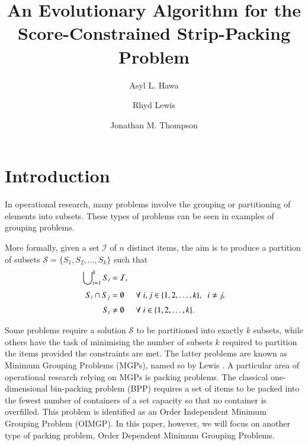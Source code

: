 \documentclass{elsarticle}
\begin{document}
	
\begin{frontmatter}
\title{An Evolutionary Algorithm for the Score-Constrained Strip-Packing Problem}
\author{Asyl L. Hawa}
\author{Rhyd Lewis}
\author{Jonathan M. Thompson}
\address{School of Mathematics, Cardiff University, Senghennydd Road, Cardiff, UK}
\end{frontmatter}


\section{Introduction}
\label{sec:intro}

In operational research, many problems involve the grouping or partitioning of elements into subsets. These types of problems can be seen in \alert{examples of grouping problems}.

More formally, given a set $\mathcal{I}$ of $n$ distinct items, the aim is to produce a partition of subsets $\mathcal{S} = \{S_1, S_2,...,S_k\}$ such that
\begin{subequations}
	\begin{align}
	\bigcup\nolimits_{i=1}^{k} S_i &= \mathcal{I}, \label{eqn:mgppackall}\\[3pt]
	S_i \cap S_j &= \emptyset \hspace{5mm} \forall \hspace{1mm} i, j \in \{1, 2,\dotsc,k\}, \hspace{2mm} i \neq j, \label{eqn:mgpnooverlap} \\[3pt]
	S_i &\neq \emptyset \hspace{5mm} \forall \hspace{1mm} i\in \{1,2,\dotsc,k\}.\label{eqn:mgpallused}
	\end{align}
\end{subequations}

\noindent Some problems require a solution $\mathcal{S}$ to be partitioned into exactly $k$ subsets, while others have the task of minimising the number of subsets $k$ required to partition the items provided the constraints are met. The latter problems are known as Minimum Grouping Problems (MGPs), named so by Lewis \cite{lewis2009}. A particular area of operational research relying on MGPs is packing problems. The classical one-dimensional bin-packing problem (BPP) requires a set of items to be packed into the fewest number of containers of a set capacity so that no container is overfilled. This problem is identified as an Order Independent Minimum Grouping Problem (OIMGP). In this paper, however, we will focus on another type of packing problem, Order Dependent Minimum Grouping Problems.
\end{document}
